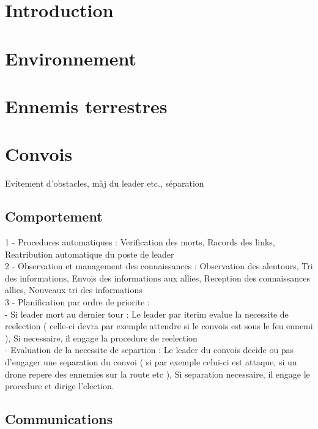 \documentclass[11pt, letterpaper]{article}
\begin{document}
\section*{Introduction}

\section{Environnement}

\section{Ennemis terrestres}

\section{Convois}

Evitement d'obstacles, màj du leader etc., séparation

\subsection{Comportement}

1 - Procedures automatiques : Verification des morts, Racords des links, Reatribution automatique du poste de leader \\

2 - Observation et management des connaissances : Observation des alentours, Tri des informations, Envois des informations aux allies, Reception des connaissances allies, Nouveaux tri des informations\\

3 - Planification par ordre de priorite : \\
- Si leader mort au dernier tour : Le leader par iterim evalue la necessite de reelection ( celle-ci devra par exemple attendre si le convois est sous le feu ennemi ), Si necessaire, il engage la procedure de reelection\\
- Evaluation de la necessite de separtion : Le leader du convois decide ou pas d'engager une separation du convoi ( si par exemple celui-ci est attaque, si un drone repere des ennemies sur la route etc ), Si separation necessaire, il engage le procedure et dirige l'election.

\subsection{Communications}
\end{document}
